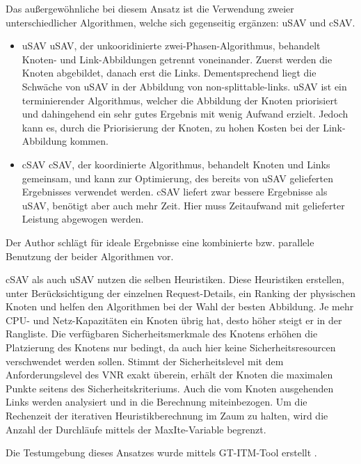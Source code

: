 \documentclass{lni}
\begin{document}
Das außergewöhnliche bei diesem Ansatz ist die Verwendung zweier unterschiedlicher Algorithmen, welche sich gegenseitig ergänzen: uSAV und cSAV.
\begin{itemize}
	\item uSAV \newline
	uSAV, der unkooridinierte zwei-Phasen-Algorithmus, behandelt Knoten- und Link-Abbildungen getrennt voneinander. Zuerst werden die Knoten abgebildet, danach erst die Links. Dementsprechend liegt die Schwäche von uSAV in der Abbildung von non-splittable-links. uSAV ist ein terminierender Algorithmus, welcher die Abbildung der Knoten priorisiert und dahingehend ein sehr gutes Ergebnis mit wenig Aufwand erzielt. Jedoch kann es, durch die Priorisierung der Knoten, zu hohen Kosten bei der Link-Abbildung kommen.

	\item cSAV \newline
	cSAV, der koordinierte Algorithmus, behandelt Knoten und Links gemeinsam, und kann zur Optimierung, des bereits von uSAV gelieferten Ergebnisses verwendet werden. cSAV liefert zwar bessere Ergebnisse als uSAV, benötigt aber auch mehr Zeit. Hier muss Zeitaufwand mit gelieferter Leistung abgewogen werden.

\end{itemize} 

Der Author schlägt für ideale Ergebnisse eine kombinierte bzw. parallele Benutzung der beider Algorithmen vor. 

cSAV als auch uSAV nutzen die selben Heuristiken. Diese Heuristiken erstellen, unter Berücksichtigung der einzelnen Request-Details, ein Ranking der physischen Knoten und helfen den Algorithmen bei der Wahl der besten Abbildung. Je mehr CPU- und Netz-Kapazitäten ein Knoten übrig hat, desto höher steigt er in der Rangliste. Die verfügbaren Sicherheitsmerkmale des Knotens erhöhen die Platzierung des Knotens nur bedingt, da auch hier keine Sicherheitsresourcen verschwendet werden sollen. Stimmt der Sicherheitslevel mit dem Anforderungslevel des VNR exakt überein, erhält der Knoten die maximalen Punkte seitens des Sicherheitskriteriums. Auch die vom Knoten ausgehenden Links werden analysiert und in die Berechnung miteinbezogen. Um die Rechenzeit der iterativen Heuristikberechnung im Zaum zu halten, wird die Anzahl der Durchläufe mittels der MaxIte-Variable begrenzt. 



Die Testumgebung dieses Ansatzes wurde mittels GT-ITM-Tool erstellt \cite{GT-ITM-Tool}. 
\end{document}
